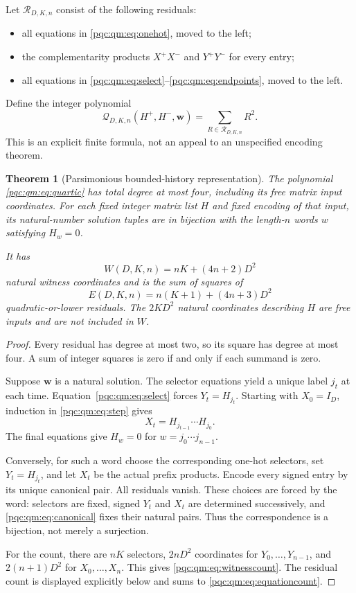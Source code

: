 \documentclass[11pt,letterpaper]{article}
\numberwithin{equation}{section}
\newtheorem{theorem}{Theorem}[section]
\theoremstyle{definition}
\theoremstyle{remark}
\begin{document}
Let $\mathcal R_{D,K,n}$ consist of the following residuals:
\begin{itemize}
\item all equations in \eqref{pqc:qm:eq:onehot}, moved to the left;
\item the complementarity products $X^+X^-$ and $Y^+Y^-$ for every entry;
\item all equations in \eqref{pqc:qm:eq:select}--\eqref{pqc:qm:eq:endpoints}, moved to the left.
\end{itemize}
Define the integer polynomial
\begin{equation}
 \mathscr Q_{D,K,n}(H^+,H^-,\mathbf w)
 =\sum_{R\in\mathcal R_{D,K,n}}R^2.
 \label{pqc:qm:eq:quartic}
\end{equation}
This is an explicit finite formula, not an appeal to an unspecified encoding theorem.

\begin{theorem}[Parsimonious bounded-history representation]
\label{pqc:qm:thm:quartic}
The polynomial \eqref{pqc:qm:eq:quartic} has total degree at most four, including its free matrix input coordinates. For each fixed integer matrix list $H$ and fixed encoding of that input, its natural-number solution tuples are in bijection with the length-$n$ words $w$ satisfying $H_w=0$.

It has
\begin{equation}
 W(D,K,n)=nK+(4n+2)D^2
 \label{pqc:qm:eq:witnesscount}
\end{equation}
natural witness coordinates and is the sum of squares of
\begin{equation}
 E(D,K,n)=n(K+1)+(4n+3)D^2
 \label{pqc:qm:eq:equationcount}
\end{equation}
quadratic-or-lower residuals. The $2KD^2$ natural coordinates describing $H$ are free inputs and are not included in $W$.
\end{theorem}
\begin{proof}
Every residual has degree at most two, so its square has degree at most four. A sum of integer squares is zero if and only if each summand is zero.

Suppose $\mathbf w$ is a natural solution. The selector equations yield a unique label $j_t$ at each time. Equation~\eqref{pqc:qm:eq:select} forces $Y_t=H_{j_t}$. Starting with $X_0=I_D$, induction in \eqref{pqc:qm:eq:step} gives
\[
 X_t=H_{j_{t-1}}\cdots H_{j_0}.
\]
The final equations give $H_w=0$ for $w=j_0\cdots j_{n-1}$.

Conversely, for such a word choose the corresponding one-hot selectors, set $Y_t=H_{j_t}$, and let $X_t$ be the actual prefix products. Encode every signed entry by its unique canonical pair. All residuals vanish. These choices are forced by the word: selectors are fixed, signed $Y_t$ and $X_t$ are determined successively, and \eqref{pqc:qm:eq:canonical} fixes their natural pairs. Thus the correspondence is a bijection, not merely a surjection.

For the count, there are $nK$ selectors, $2nD^2$ coordinates for $Y_0,\ldots,Y_{n-1}$, and $2(n+1)D^2$ for $X_0,\ldots,X_n$. This gives \eqref{pqc:qm:eq:witnesscount}. The residual count is displayed explicitly below and sums to \eqref{pqc:qm:eq:equationcount}.
\end{proof}
\end{document}
